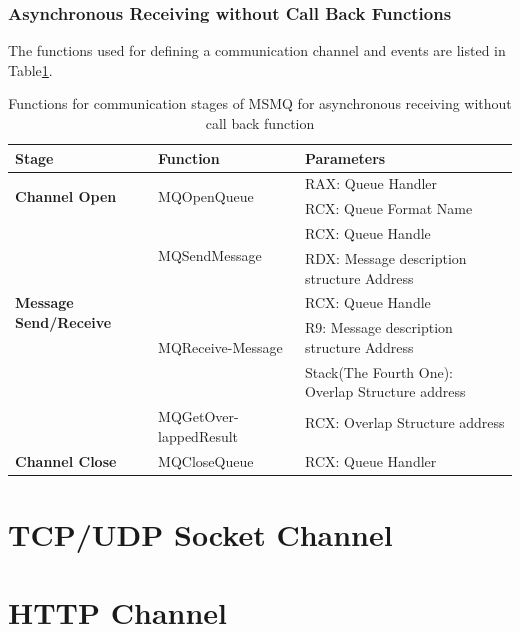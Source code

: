 \subsubsection{Asynchronous Receiving without Call Back Functions}
The functions used for defining a communication channel and events are listed in Table\ref{msmqasynfunctions}.
    \begin{table}[h]
        \centering
        \caption{Functions for communication stages of MSMQ for asynchronous receiving without call back function}
        \label{msmqasynfunctions}
        \begin{tabular}{|l|l|l|}
            \hline
             \textbf{Stage} & \textbf{Function}& \textbf{Parameters}  \\
             \hline
             \multirow{2}{*}{{\textbf{Channel Open}}}
             &\multirow{2}{*}{{MQOpenQueue}} &  RAX: Queue Handler\\
              \cline{3-3} 
             & &  RCX: Queue Format Name\\
            \hline
             \multirow{5}{*}{\parbox{2.5cm}{\textbf{Message Send/Receive}}}
             &\multirow{2}{*}{MQSendMessage} &  RCX: Queue Handle \\
              \cline{3-3} 
             &&  RDX: Message description structure Address \\
            \cline{2-3}
             & \multirow{3}{*}{\parbox{2.5cm}{MQReceive-Message}}&  RCX: Queue Handle \\
              \cline{3-3} 
              &&  R9: Message description structure Address \\
                            \cline{3-3} 
              &&  Stack(The Fourth One): Overlap Structure address\\
                          \cline{2-3}
                          
              & \multirow{2}{*}{\parbox{2.5cm}{MQGetOver-lappedResult}} &  RCX: Overlap Structure address  \\
              &&\\
            \hline
            \textbf{Channel Close} &MQCloseQueue & RCX: Queue Handler \\
            \hline
        \end{tabular}
    \end{table}
\section{TCP/UDP Socket Channel}


\section{HTTP Channel}


